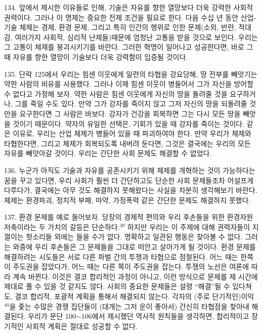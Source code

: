 \documentclass[11pt,a4paper]{article}
\begin{document}
\begin{multicols}{2}
134. 앞에서 제시한 이유들로 인해, 기술은 자유를 향한 열망보다 더욱 강력한 사회적 권력이다. 그러나  이 명제는 중요한 전제 조건을 필요로 한다. 다음 수십 년 동안 산업-기술 체제는 경제, 환경 문제, 그리고  특히 인간의 행위로 인한 문제(소외, 반란, 적대감, 여러가지 사회적, 심리적 난제들)때문에 엄청난  고통을 받을 것으로 보인다. 우리는 그 고통이 체제를 붕괴시키기를 바란다. 그러한 혁명이 일어나고  성공한다면, 바로 그 때 자유를 향한 열망이 기술보다 더욱 강력함이 입증될 것이다.  


135. 단락 125에서 우리는 힘센 이웃에게 일련의 타협을 강요당해, 땅 전부를 빼앗기는 약한 사람의  비유를 사용했다. 그러나 이제 힘센 이웃이 병들어서 그가 자신을 방어할 수 없다고 가정해 보자. 약한  사람은 힘센 이웃에게 자신의 땅을 돌려줄 것을 요구하거나, 그를 죽일 수도 있다. 만약 그가 강자를  죽이지 않고 그저 자신의 땅을 되돌려줄 것만을 요구한다면 그 사람은 바보다. 강자가 건강을 회복하면  그는 다시 모든 땅을 빼앗을 것이기 때문이다. 약자의 유일한 선택은, 기회가 있을 때 강자를 죽이는  것이다. 같은 이유로, 우리는 산업 체제가 병들어 있을 때 파괴하여야 한다. 만약 우리가 체제와  타협한다면, 그리고 체제가 회복되도록 내버려 둔다면, 그것은 결국에는 우리의 모든 자유를 빼앗아갈 것이다.  
우리는 간단한 사회 문제도 해결할 수 없었다. 


136. 누군가 아직도 기술과 자유를 공존시키기 위해 체제를 개혁하는 것이 가능하다는 꿈을 꾸고 있다면, 우리 사회가 훨씬 더 간단하고도 단순한 사회 문제들조차 어설프게 다루다가, 결국에는 아무 것도  해결하지 못해왔다는 사실을 차분히 생각해보기 바란다. 체제는 환경파괴, 정치적 부패, 마약, 가정폭력  같은 간단한 문제도 해결하지 못했다.  


137. 환경 문제를 예로 들어보자. 당장의 경제적 편의와 우리 후손들을 위한 환경자원 저축이라는 두 가치의 갈등은 단순하다.\hyperlink{39}{$^{39}$} 하지만 우리는 이 주제에 대해 권력자들이 지껄이는 헛소리들 외에는 들을  수가 없다. 명확하고 일관된 행동은 찾아볼 수 없다. 그러는 와중에 우리 후손들은 그 문제들을 그대로  떠안고 살아가게 될 것이다. 환경 문제를 해결하려는 시도들은 서로 다른 파벌 간의 투쟁과 타협으로  점철된다. 어느 때는 한쪽이 주도권을 잡았다가, 어느 때는 다른 쪽이 주도권을 잡는다. 투쟁의 노선은  여론에 따라 계속 바뀐다. 이것은 결코 합리적인 과정이 아니고, 이런 방식으로 문제를 제 시간에 제대로  풀 수 있을 것 같지도 않다. 사회의 중요한 문제들은 설령 “해결”될 수 있다쳐도, 결코 합리적, 포괄적  계획을 통해서 해결되지 않는다. 각자의 (주로 단기적인)이익\hyperlink{40}{$^{40}$}을 좇는 수많은 경쟁 집단들이 (대개는  그저 운이 좋아서) 간신히 타협점을 찾아내 해결된다. 우리가 문단 100${\sim}$106에서 제시했던 역사적  원칙들을 생각하면, 합리적이고 장기적인 사회적 계획은 절대로 성공할 수 없다. 



\end{multicols}
\end{document}
